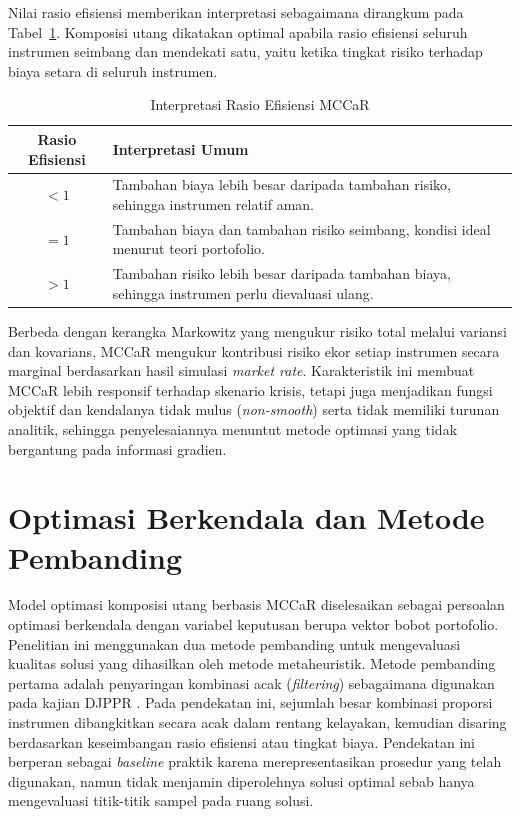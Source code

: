 Nilai rasio efisiensi memberikan interpretasi sebagaimana dirangkum pada Tabel~\ref{tab:rasio-efisiensi}. Komposisi utang dikatakan optimal apabila rasio efisiensi seluruh instrumen seimbang dan mendekati satu, yaitu ketika tingkat risiko terhadap biaya setara di seluruh instrumen.
\begin{table}[H]
    \centering
    \caption{Interpretasi Rasio Efisiensi MCCaR}
    \label{tab:rasio-efisiensi}
    \begin{tabularx}{\textwidth}{c X}
    \hline
    \textbf{Rasio Efisiensi} & \textbf{Interpretasi Umum} \\
    \hline
    $<1$ & Tambahan biaya lebih besar daripada tambahan risiko, sehingga
    instrumen relatif aman. \\
    $=1$ & Tambahan biaya dan tambahan risiko seimbang, kondisi ideal menurut
    teori portofolio. \\
    $>1$ & Tambahan risiko lebih besar daripada tambahan biaya, sehingga
    instrumen perlu dievaluasi ulang. \\
    \hline
    \end{tabularx}
\end{table}

Berbeda dengan kerangka Markowitz yang mengukur risiko total melalui variansi dan kovarians, MCCaR mengukur kontribusi risiko ekor setiap instrumen secara marginal berdasarkan hasil simulasi \textit{market rate}. Karakteristik ini membuat MCCaR lebih responsif terhadap skenario krisis, tetapi juga menjadikan fungsi objektif dan kendalanya tidak mulus (\textit{non-smooth}) serta tidak memiliki turunan analitik, sehingga penyelesaiannya menuntut metode optimasi yang tidak bergantung pada informasi gradien.


\section{Optimasi Berkendala dan Metode Pembanding}\label{sec:benchmark}
Model optimasi komposisi utang berbasis MCCaR diselesaikan sebagai persoalan optimasi berkendala dengan variabel keputusan berupa vektor bobot portofolio. Penelitian ini menggunakan dua metode pembanding untuk mengevaluasi kualitas solusi yang dihasilkan oleh metode metaheuristik. Metode pembanding pertama adalah penyaringan kombinasi acak (\textit{filtering}) sebagaimana digunakan pada kajian DJPPR . Pada pendekatan ini, sejumlah besar kombinasi proporsi instrumen dibangkitkan secara acak dalam rentang kelayakan, kemudian disaring berdasarkan keseimbangan rasio efisiensi atau tingkat biaya. Pendekatan ini berperan sebagai \textit{baseline} praktik karena merepresentasikan prosedur yang telah digunakan, namun tidak menjamin diperolehnya solusi optimal sebab hanya mengevaluasi titik-titik sampel pada ruang solusi.


